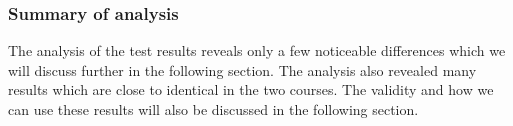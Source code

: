 
\subsubsection*{Summary of analysis}
The analysis of the test results reveals only a few noticeable differences which we will discuss further in the following section. The analysis also revealed many results which are close to identical in the two courses. The validity and how we can use these results will also be discussed in the following section.

